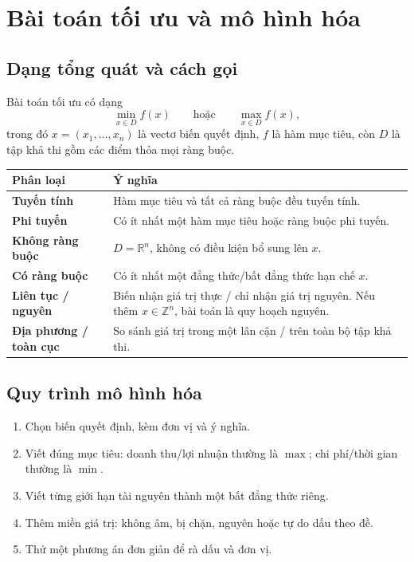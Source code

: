 \documentclass[11pt,a4paper]{article}
\newcommand{\R}{\mathbb{R}}
\begin{document}
\section{Bài toán tối ưu và mô hình hóa}
\subsection{Dạng tổng quát và cách gọi}
Bài toán tối ưu có dạng
\[
\min_{x\in D} f(x)\qquad\text{hoặc}\qquad \max_{x\in D} f(x),
\]
trong đó \(x=(x_1,\ldots,x_n)\) là vectơ biến quyết định, \(f\) là hàm mục tiêu, còn \(D\) là tập khả thi gồm các điểm thỏa mọi ràng buộc.

\begin{center}
\begin{tabularx}{.96\textwidth}{>{\bfseries}p{}Y}
\toprule
Phân loại & Ý nghĩa\\
\midrule
Tuyến tính & Hàm mục tiêu và tất cả ràng buộc đều tuyến tính.\\
Phi tuyến & Có ít nhất một hàm mục tiêu hoặc ràng buộc phi tuyến.\\
Không ràng buộc & \(D=\R^n\), không có điều kiện bổ sung lên \(x\).\\
Có ràng buộc & Có ít nhất một đẳng thức/bất đẳng thức hạn chế \(x\).\\
Liên tục / nguyên & Biến nhận giá trị thực / chỉ nhận giá trị nguyên. Nếu thêm \(x\in\mathbb Z^n\), bài toán là quy hoạch nguyên.\\
Địa phương / toàn cục & So sánh giá trị trong một lân cận / trên toàn bộ tập khả thi.\\
\bottomrule
\end{tabularx}
\end{center}

\subsection{Quy trình mô hình hóa}
\begin{enumerate}
\item Chọn biến quyết định, kèm đơn vị và ý nghĩa.
\item Viết đúng mục tiêu: doanh thu/lợi nhuận thường là \(\max\); chi phí/thời gian thường là \(\min\).
\item Viết từng giới hạn tài nguyên thành một bất đẳng thức riêng.
\item Thêm miền giá trị: không âm, bị chặn, nguyên hoặc tự do dấu theo đề.
\item Thử một phương án đơn giản để rà dấu và đơn vị.
\end{enumerate}
\end{document}
